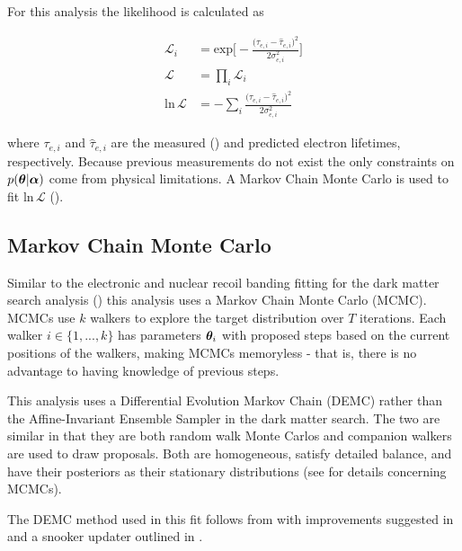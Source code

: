 For this analysis the likelihood is calculated as

\begin{subequations}
\begin{align}
\mathcal{L}_i &= \mathrm{exp} \Bigg[ -\frac{\big(\tau_{e, i} -
\hat{\tau}_{e, i} \big)^2}{2 \sigma_{e, i}^2} \Bigg]
\\[3pt]
\mathcal{L} &= \prod_i \mathcal{L}_i
\\[3pt]
\mathrm{ln}\, \mathcal{L} &= -\sum_i \frac{\big(\tau_{e, i} -
\hat{\tau}_{e, i} \big)^2}{2\sigma_{e, i}^2}
\end{align}
\label{eq:elifetime_fit_mcmc_de_snooker_projs}
\end{subequations}

\noindent where $\tau_{e, i}$ and $\hat{\tau}_{e, i}$ are the measured () and predicted
electron lifetimes, respectively.  Because previous measurements do not exist the only constraints on $p(\boldsymbol{\theta}|\boldsymbol{\alpha})$
come from physical limitations.  A Markov Chain Monte Carlo is used to fit $\mathrm{ln}\, \mathcal{L}$
().



\subsection{Markov Chain Monte Carlo}
\label{subsec:elifetime_fit_mcmc}
Similar to the electronic and nuclear recoil banding fitting for the dark matter search analysis
() this analysis uses a Markov Chain Monte Carlo (MCMC).  MCMCs use $k$ walkers
to explore the target distribution
over $T$ iterations.  Each walker $i \in \{1, ..., k\}$ has parameters $\boldsymbol{\theta}_i$ with proposed steps based on the current
positions of the walkers, making MCMCs memoryless - that is, there is no advantage to having knowledge of previous steps.

This analysis uses a Differential Evolution Markov Chain (DEMC) rather than the Affine-Invariant Ensemble Sampler in the dark matter
search.  The two are similar in that they are both random walk Monte Carlos and companion walkers are used to draw proposals.  Both are
homogeneous, satisfy detailed balance, and have their posteriors as their stationary distributions (see
 for details concerning MCMCs).

The DEMC method used in this fit follows from
 with improvements suggested in  and a snooker updater outlined in .

